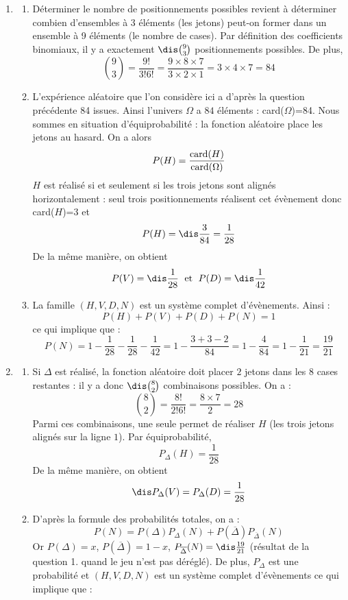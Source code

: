 \documentclass[a4paper,10pt]{report}
\begin{document}
\corr \begin{enumerate}
\item 
\begin{enumerate}
\item Déterminer le nombre de positionnements possibles revient à déterminer combien d'ensembles à 3 éléments (les jetons) peut-on former dans un ensemble à 9 éléments (le nombre de cases). Par définition des coefficients binomiaux, il y a exactement $\dis \binom{9}{3}$ positionnements possibles. De plus,
\[ \binom{9}{3} = \frac{9!}{3!6!}= \frac{9 \times 8 \times 7}{3 \times 2 \times 1} = 3\times 4 \times 7 =84 \]
\item L'expérience aléatoire que l'on considère ici a d'après la question précédente 84 issues. Ainsi l'univers $\Omega$ a $84$ éléments : card($\Omega$)=84. Nous sommes en situation d'équiprobabilité : la fonction aléatoire place les jetons au hasard. On a alors 
\[ P(H)= \frac{\hbox{card}(H)}{\hbox{card}(\Omega)} \]
$H$ est réalisé si et seulement si les trois jetons sont alignés horizontalement : seul trois positionnements réalisent cet évènement donc card($H$)=$3$ et 
$$P(H) = \dis \frac{3}{84} = \frac{1}{28} $$
De la même manière, on obtient 
$$P(V) = \dis \frac{1}{28} \; \hbox{ et } \; P(D) = \dis \frac{1}{42} $$
\item La famille $(H,V,D,N)$ est un système complet d'évènements. Ainsi : 
\[ P(H) + P(V) + P(D) + P(N) = 1 \]
ce qui implique que  :
\[ P(N) = 1 - \frac{1}{28} - \frac{1}{28} -\frac{1}{42} = 1-\frac{3+3-2}{84} = 1-\frac{4}{84} = 1-\frac{1}{21} = \frac{19}{21} \]
\end{enumerate}
\item 
\begin{enumerate}
\item Si $\Delta$ est réalisé, la fonction aléatoire doit placer $2$ jetons dans les $8$ cases restantes : il y a donc $\dis \binom{8}{2}$ combinaisons possibles. On a :
\[ \binom{8}{2} = \frac{8!}{2!6!} = \frac{8 \times 7}{2} = 28 \]
Parmi ces combinaisons, une seule permet de réaliser $H$ (les trois jetons alignés sur la ligne $1$). Par équiprobabilité,
\[ P_{\Delta}(H) = \frac{1}{28} \]
De la même manière, on obtient 
$$\dis P_{\Delta}(V) =  P_{\Delta}(D) = \frac{1}{28} $$
\item D'après la formule des probabilités totales, on a :
\[ P(N) = P(\Delta) P_{\Delta}(N) + P(\overline{\Delta}) P_{\overline{\Delta}}(N) \]
Or $P(\Delta)=x$, $P(\overline{\Delta})= 1 - x$, $P_{\overline{\Delta}}(N) = \dis \frac{19}{21}$ (résultat de la question 1. quand le jeu n'est pas déréglé). De plus, $P_{\Delta}$ est une probabilité et $(H,V,D,N)$ est un système complet d'évènements ce qui implique que :

\end{enumerate}
\end{enumerate}
\end{document}
